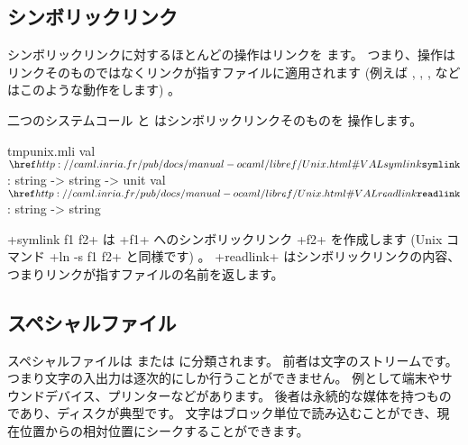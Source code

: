 \subsection*{シンボリックリンク}

シンボリックリンクに対するほとんどの操作はリンクを  ます。
つまり、操作はリンクそのものではなくリンクが指すファイルに適用されます
(例えば , , ,  など
はこのような動作をします) 。

二つのシステムコール  と  はシンボリックリンクそのものを
操作します。
%
\begin{listingcodefile}{tmpunix.mli}
val $\libvalue{Unix}{symlink}$  : string -> string -> unit
val $\libvalue{Unix}{readlink}$ : string -> string
\end{listingcodefile}
%
\ml+symlink f1 f2+ は \ml+f1+ へのシンボリックリンク \ml+f2+ を作成します
(Unix コマンド \ml+ln -s f1 f2+ と同様です) 。
\ml+readlink+ はシンボリックリンクの内容、つまりリンクが指すファイルの名前を返します。

\subsection*{\label{sec/speciaux}スペシャルファイル}

スペシャルファイルは  または  に分類されます。
前者は文字のストリームです。つまり文字の入出力は逐次的にしか行うことができません。
例として端末やサウンドデバイス、プリンターなどがあります。
後者は永続的な媒体を持つものであり、ディスクが典型です。
文字はブロック単位で読み込むことができ、現在位置からの相対位置にシークすることができます。

